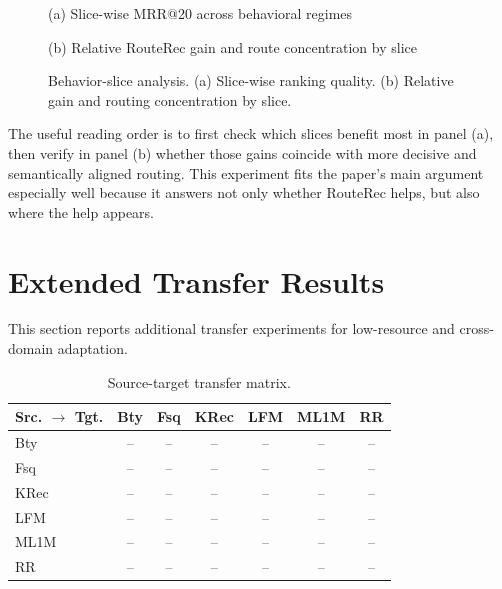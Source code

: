 \documentclass[sigconf,review,anonymous]{acmart}
\newcommand{\placeholderpanel}[1]{\fbox{\rule{0pt}{#1}\rule{0.92\linewidth}{0pt}}}
\begin{document}
\begin{figure}[t]
  \centering
  \begin{minipage}[t]{\linewidth}
    \centering
    \placeholderpanel{1.25in}

    \vspace{0.35em}
    {\footnotesize (a) Slice-wise MRR@20 across behavioral regimes}
  \end{minipage}\hfill

  \vspace{0.75em}

  \begin{minipage}[t]{\linewidth}
    \centering
    \placeholderpanel{1.25in}

    \vspace{0.35em}
    {\footnotesize (b) Relative RouteRec gain and route concentration by slice}
  \end{minipage}
  \caption{Behavior-slice analysis. (a) Slice-wise ranking quality. (b) Relative gain and routing concentration by slice.}
  \label{fig:appendix-behavior-slices}
\end{figure}

The useful reading order is to first check which slices benefit most in panel (a), then verify in panel (b) whether those gains coincide with more decisive and semantically aligned routing. This experiment fits the paper's main argument especially well because it answers not only whether RouteRec helps, but also where the help appears.

\section{Extended Transfer Results}
\label{app:transfer}
This section reports additional transfer experiments for low-resource and cross-domain adaptation.

\begin{table}[t]
  \centering
  \caption{Source-target transfer matrix.}
  \label{tab:appendix-transfer-matrix}
  \scriptsize
  \setlength{\tabcolsep}{3pt}
  \begin{tabular*}{\columnwidth}{@{\extracolsep{\fill}}lcccccc@{}}
    \toprule
    Src. $\rightarrow$ Tgt. & Bty & Fsq & KRec & LFM & ML1M & RR \\
    \midrule
    Bty & -- & -- & -- & -- & -- & -- \\
    Fsq & -- & -- & -- & -- & -- & -- \\
    KRec & -- & -- & -- & -- & -- & -- \\
    LFM & -- & -- & -- & -- & -- & -- \\
    ML1M & -- & -- & -- & -- & -- & -- \\
    RR & -- & -- & -- & -- & -- & -- \\
    \bottomrule
  \end{tabular*}
\end{table}
\end{document}
